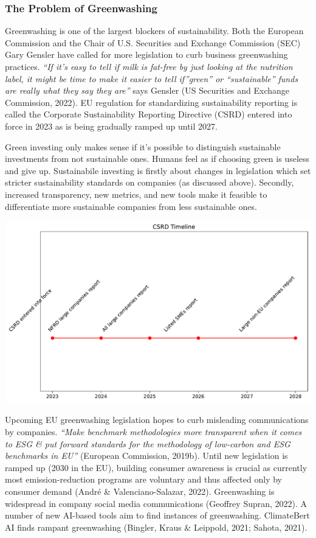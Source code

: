 \documentclass[
  letterpaper,
  DIV=11,
  numbers=noendperiod]{scrartcl}
\begin{document}
\subsubsection{The Problem of
Greenwashing}\label{the-problem-of-greenwashing}

Greenwashing is one of the largest blockers of sustainability. Both the
European Commission and the Chair of U.S. Securities and Exchange
Commission (SEC) Gary Gensler have called for more legislation to curb
business greenwashing practices. \emph{``If it's easy to tell if milk is
fat-free by just looking at the nutrition label, it might be time to
make it easier to tell if''green'' or ``sustainable'' funds are really
what they say they are''} says Gensler (US Securities and Exchange
Commission, 2022). EU regulation for standardizing sustainability
reporting is called the Corporate Sustainability Reporting Directive
(CSRD) entered into force in 2023 as is being gradually ramped up until
2027.

Green investing only makes sense if it's possible to distinguish
sustainable investments from not sustainable ones. Humans feel as if
choosing green is useless and give up. Sustainabile investing is firstly
about changes in legislation which set stricter sustainability standards
on companies (as discussed above). Secondly, increased transparency, new
metrics, and new tools make it feasible to differentiate more
sustainable companies from less sustainable ones.

\includegraphics{_thesis_files/figure-pdf/cell-50-output-1.pdf}

Upcoming EU greenwashing legislation hopes to curb misleading
communications by companies. \emph{``Make benchmark methodologies more
transparent when it comes to ESG \& put forward standards for the
methodology of low-carbon and ESG benchmarks in EU''} (European
Commission, 2019b). Until new legislation is ramped up (2030 in the EU),
building consumer awareness is crucial as currently most
emission-reduction programs are voluntary and thus affected only by
consumer demand (André \& Valenciano-Salazar, 2022). Greenwashing is
widespread in company social media communications (Geoffrey Supran,
2022). A number of new AI-based tools aim to find instances of
greenwashing. ClimateBert AI finds rampant greenwashing (Bingler, Kraus
\& Leippold, 2021; Sahota, 2021).
\end{document}
